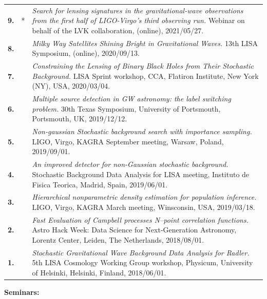 {\begin{longtable}{rp{0.3cm}p{15.8cm}}
%
\textbf{9.} & * & \textit{Search for lensing signatures in the gravitational-wave observations from the first half of LIGO-Virgo’s third observing run.}
\newline{}
Webinar on behalf of the LVK collaboration, (online), 2021/05/27.
\vspace{0.05cm}\\
%
\textbf{8.} &  & \textit{Milky Way Satellites Shining Bright in Gravitational Waves.}
\newline{}
13th LISA Symposium, (online), 2020/09/13.
\vspace{0.05cm}\\
%
\textbf{7.} &  & \textit{Constraining the Lensing of Binary Black Holes from Their Stochastic Background.}
\newline{}
LISA Sprint workshop, CCA, Flatiron Institute, New York (NY), USA, 2020/03/04.
\vspace{0.05cm}\\
%
\textbf{6.} &  & \textit{Multiple source detection in GW astronomy: the label switching problem.}
\newline{}
30th Texas Symposium, University of Portsmouth, Portsmouth, UK, 2019/12/12.
\vspace{0.05cm}\\
%
\textbf{5.} &  & \textit{Non-gaussian Stochastic background search with importance sampling.}
\newline{}
LIGO, Virgo, KAGRA September meeting, Warsaw, Poland, 2019/09/01.
\vspace{0.05cm}\\
%
\textbf{4.} &  & \textit{An improved detector for non-Gaussian stochastic background.}
\newline{}
Stochastic Background Data Analysis for LISA meeting, Instituto de Fisica Teorica, Madrid, Spain, 2019/06/01.
\vspace{0.05cm}\\
%
\textbf{3.} &  & \textit{Hierarchical nonparametric density estimation for population inference.}
\newline{}
LIGO, Virgo, KAGRA March meeting, Winsconsin, USA, 2019/03/18.
\vspace{0.05cm}\\
%
\textbf{2.} &  & \textit{Fast Evaluation of Campbell processes N–point correlation functions.}
\newline{}
Astro Hack Week: Data Science for Next-Generation Astronomy, Lorentz Center, Leiden, The Netherlands, 2018/08/01.
\vspace{0.05cm}\\
%
\textbf{1.} &  & \textit{Stochastic Gravitational Wave Background Data Analysis for Radler.}
\newline{}
5th LISA Cosmology Working Group workshop, Physicum, University of Helsinki, Helsinki, Finland, 2018/06/01.
\vspace{0.05cm}\\
%
\end{longtable} }
\textcolor{color1}{\textbf{Seminars:}}
\vspace{-0.5cm}

